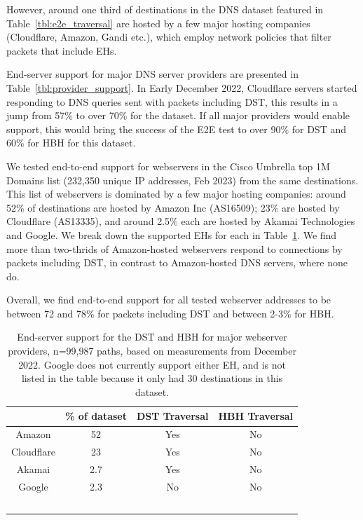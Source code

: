 \documentclass[conference]{IEEEtran}
\begin{document}
However, around one third of destinations in the DNS dataset featured in Table~\ref{tbl:e2e_traversal} are hosted by a few major hosting companies (Cloudflare, Amazon, Gandi etc.), which employ network policies that filter packets that include EHs. 

End-server support for major DNS server providers are presented in Table~\ref{tbl:provider_support}. In Early December 2022, Cloudflare servers started responding to DNS queries sent with packets including DST, this results in a jump from 57\% to over 70\% for the dataset. If all major providers would enable support, this would bring the success of the E2E test to over 90\% for DST and 60\% for HBH for this dataset.

We tested end-to-end support for webservers in the Cisco Umbrella top 1M Domains list (232,350 unique IP addresses, Feb 2023) from the same destinations. This list of webservers is dominated by a few major hosting companies: around 52\% of destinations are hosted by Amazon Inc (AS16509); 23\% are hosted by Cloudflare (AS13335), and around 2.5\% each are hosted by Akamai Technologies and Google. We break down the supported EHs for each in Table~\ref{tbl:web_provider_support}. We find more than two-thrids of Amazon-hosted webservers respond to connections by packets including DST, in contrast to Amazon-hosted DNS servers, where none do. 

Overall, we find end-to-end support for all tested webserver addresses to be between 72 and 78\% for  packets including DST and between 2-3\% for HBH.


\begin{table} 
\begin{tabular}{c|c|c|c}
           & \% of dataset & DST Traversal & HBH Traversal\\
\hline
Amazon & 52                      & Yes                & No                 \\
\hline
Cloudflare     & 23                     & Yes                 & No                 \\
\hline
Akamai    & 2.7                     & Yes                & No                 \\
\hline
Google      & 2.3                     & No                 & No                 \\
\
\end{tabular}
\label{tbl:web_provider_support}
\caption{End-server support for the DST and HBH for major webserver providers, n=99,987 paths, based on measurements from December 2022. Google does not currently support either EH, and is not listed in the table because it only had 30 destinations in this dataset.
}
\end{table}
\end{document}
